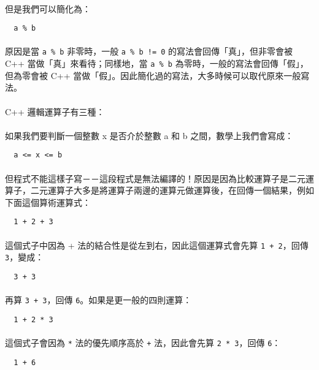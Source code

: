 \documentclass[12pt,a4paper,oneside]{report}
\begin{document}
\begin{CJK}{UTF8}{bkai}
\paragraph{}但是我們可以簡化為：
\begin{lstlisting}
  a % b
\end{lstlisting}
\paragraph{}原因是當 \lstinline{a % b} 非零時，一般 \lstinline{a % b != 0} 的寫法會回傳「真」，但非零會被 C++ 當做「真」來看待；同樣地，當 \lstinline{a % b} 為零時，一般的寫法會回傳「假」，但為零會被 C++ 當做「假」。因此簡化過的寫法，大多時候可以取代原來一般寫法。
\paragraph{}C++ 邏輯運算子有三種：
\paragraph{}如果我們要判斷一個整數 x 是否介於整數 a 和 b 之間，數學上我們會寫成：
\begin{lstlisting}
  a <= x <= b
\end{lstlisting}
\paragraph{}但程式不能這樣子寫－－這段程式是無法編譯的！原因是因為比較運算子是二元運算子，二元運算子大多是將運算子兩邊的運算元做運算後，在回傳一個結果，例如下面這個算術運算式：
\begin{lstlisting}
  1 + 2 + 3
\end{lstlisting}
\paragraph{}這個式子中因為 + 法的結合性是從左到右，因此這個運算式會先算 \lstinline{1 + 2}，回傳 \lstinline{3}，變成：
\begin{lstlisting}
  3 + 3
\end{lstlisting}
\paragraph{}再算 \lstinline{3 + 3}，回傳 \lstinline{6}。如果是更一般的四則運算：
\begin{lstlisting}
  1 + 2 * 3
\end{lstlisting}
\paragraph{}這個式子會因為 \lstinline{*} 法的優先順序高於 \lstinline{+} 法，因此會先算 \lstinline{2 * 3}，回傳 \lstinline{6}：
\begin{lstlisting}
  1 + 6
\end{lstlisting}

\end{CJK}
\end{document}
